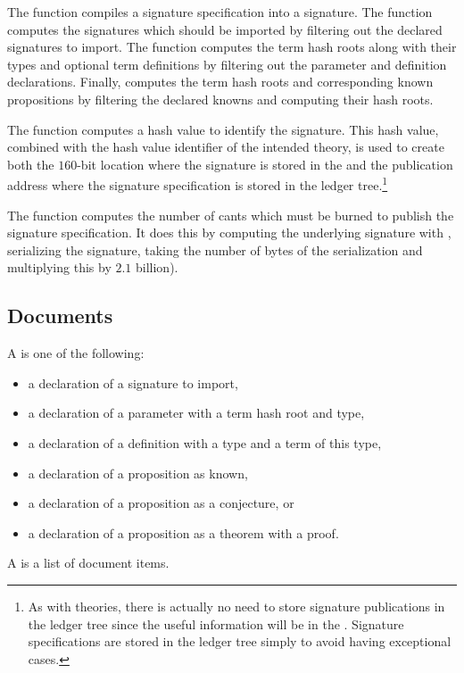 The function
{}
compiles a signature specification into a signature.
The function {} computes the signatures which should be imported
by filtering out the declared signatures to import.
The function {} computes the term hash roots along with their types
and optional term definitions by filtering out the parameter and definition
declarations.
Finally, {} computes the term hash roots and corresponding known
propositions by filtering the declared knowns and computing their hash roots.

The function {} computes a hash value to identify the signature.
This hash value, combined with the hash value identifier of the intended theory,
is used to create both the $160$-bit location where the signature is stored
in the {}
and the publication address where the signature specification is stored in the ledger tree.\footnote{As with theories, there is actually no need to store signature publications in the ledger tree since the useful information will be in the {}. Signature specifications are stored in the ledger tree simply to
avoid having exceptional cases.}

The function {} computes the number of cants which must
be burned
to publish the signature specification. It does this by computing the underlying signature with {},
serializing the signature, taking the number of bytes of the serialization and multiplying this by
$2.1$ billion).


\subsection{Documents}

A {} is one of the following:
\begin{itemize}
\item a declaration of a signature to import,
\item a declaration of a parameter with a term hash root and type,
\item a declaration of a definition with a type and a term of this type,
\item a declaration of a proposition as known,
\item a declaration of a proposition as a conjecture, or
\item a declaration of a proposition as a theorem with a proof.
\end{itemize}
A {} is a list of document items.

